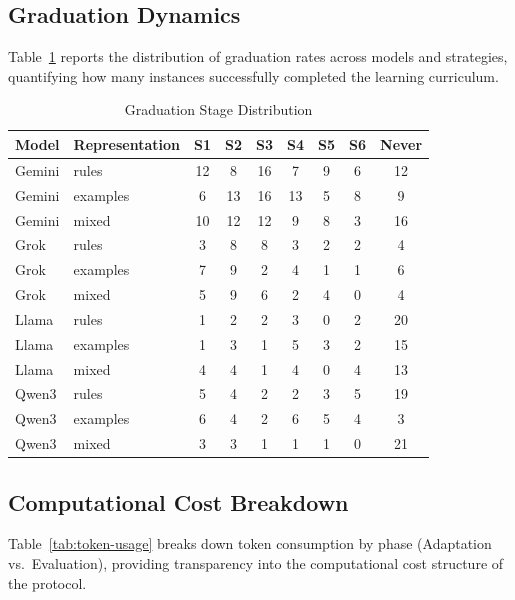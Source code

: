 \documentclass[sigconf]{acmart}
\begin{document}
\subsection{Graduation Dynamics}
\label{app:graduation}

Table~\ref{tab:graduation-distribution} reports the distribution of graduation rates across models and strategies, quantifying how many instances successfully completed the learning curriculum.

\begin{table}[htbp]
\centering
\scriptsize
\caption{Graduation Stage Distribution}
\label{tab:graduation-distribution}
\begin{tabular}{llccccccc}
\toprule
\textbf{Model} & \textbf{Representation} & \textbf{S1} & \textbf{S2} & \textbf{S3} & \textbf{S4} & \textbf{S5} & \textbf{S6} & \textbf{Never} \\
\midrule
Gemini & rules & 12 & 8 & 16 & 7 & 9 & 6 & 12 \\
Gemini & examples & 6 & 13 & 16 & 13 & 5 & 8 & 9 \\
Gemini & mixed & 10 & 12 & 12 & 9 & 8 & 3 & 16 \\
\midrule
Grok & rules & 3 & 8 & 8 & 3 & 2 & 2 & 4 \\
Grok & examples & 7 & 9 & 2 & 4 & 1 & 1 & 6 \\
Grok & mixed & 5 & 9 & 6 & 2 & 4 & 0 & 4 \\
\midrule
Llama & rules & 1 & 2 & 2 & 3 & 0 & 2 & 20 \\
Llama & examples & 1 & 3 & 1 & 5 & 3 & 2 & 15 \\
Llama & mixed & 4 & 4 & 1 & 4 & 0 & 4 & 13 \\
\midrule
Qwen3 & rules & 5 & 4 & 2 & 2 & 3 & 5 & 19 \\
Qwen3 & examples & 6 & 4 & 2 & 6 & 5 & 4 & 3 \\
Qwen3 & mixed & 3 & 3 & 1 & 1 & 1 & 0 & 21 \\
\bottomrule
\end{tabular}
\end{table}

\subsection{Computational Cost Breakdown}
\label{app:token-usage}

Table~\ref{tab:token-usage} breaks down token consumption by phase (Adaptation vs.\ Evaluation), providing transparency into the computational cost structure of the protocol.
\end{document}
